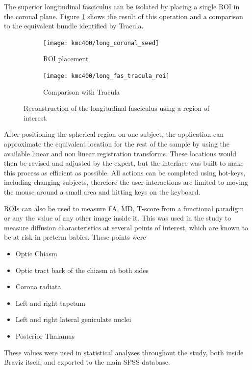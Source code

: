 The superior longitudinal fasciculus can be isolated by placing a single ROI in the coronal plane. Figure \ref{fig_long_fasc} shows the result of this operation and a comparison to the equivalent bundle identified by Tracula. 

\begin{figure}
\centering
	\begin{subfigure}{0.45\textwidth}
		\texttt{[image: kmc400/long\_coronal\_seed]}
		\caption{ROI placement}
	\end{subfigure}\hfill
	\begin{subfigure}{0.45\textwidth}
\texttt{[image: kmc400/long\_fas\_tracula\_roi]}
		\caption{Comparison with Tracula}
	\end{subfigure}

\caption{Reconstruction of the longitudinal fasciculus using a region of interest.
\label{fig_long_fasc}}
\end{figure} 

After positioning the spherical region on one subject, the application can approximate the equivalent location for the rest of the sample by using the available linear and non linear registration transforms. These locations would then be revised and adjusted by the expert, but the interface was built to make this process as efficient as possible. All actions can be completed using hot-keys, including changing subjects, therefore the user interactions are limited to moving the mouse around a small area and hitting keys on the keyboard.

ROIs can also be used to measure FA, MD, T-score from a functional paradigm or any the value of any other image inside it. This was used in the study to measure diffusion characteristics at several points of interest, which are known to be at risk in preterm babies. These points were

\begin{itemize}
\item Optic Chiasm
\item Optic tract back of the chiasm at both sides
\item Corona radiata
\item Left and right tapetum
\item Left and right lateral geniculate nuclei
\item Posterior Thalamus
\end{itemize}

These values were used in statistical analyses throughout the study, both inside Braviz itself, and exported to the main SPSS database.

